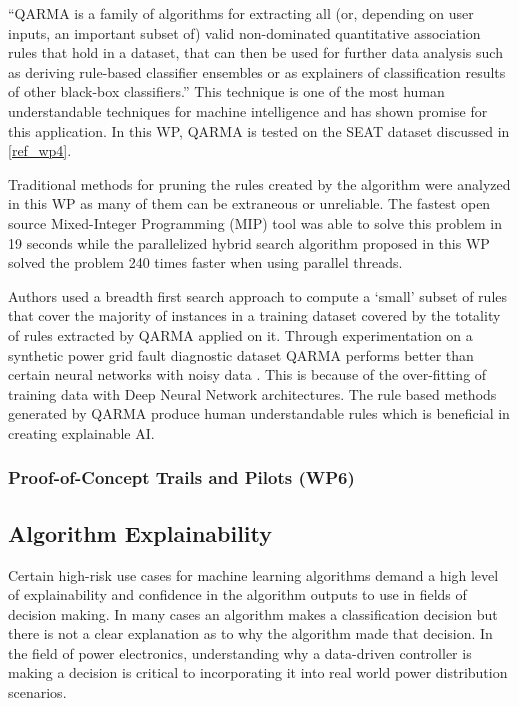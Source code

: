 \enquote{QARMA is a family of algorithms for extracting all (or, depending on user inputs, an important subset of) valid non-dominated quantitative association rules that hold in a dataset, that can then be used for further data analysis such as deriving rule-based classifier ensembles or as explainers of classification results of other black-box classifiers.}  This technique is one of the most human understandable techniques for machine intelligence and has shown promise for this application. In this WP, QARMA is tested on the SEAT dataset discussed in \ref{ref_wp4}.

Traditional methods for pruning the rules created by the algorithm were analyzed in this WP as many of them can be extraneous or unreliable. The fastest open source Mixed-Integer Programming (MIP) tool was able to solve this problem in 19 seconds while the parallelized hybrid search algorithm proposed in this WP solved the problem 240 times faster when using parallel threads.

Authors \cite{wp5.1} used a breadth first search approach to compute a `small' subset of rules that cover the majority of instances in a training dataset covered by the totality of rules extracted by QARMA applied on it. Through experimentation on a synthetic power grid fault diagnostic dataset QARMA performs better than certain neural networks with noisy data \parencite{ml-performance-power-trans}. This is because of the over-fitting of training data with Deep Neural Network architectures. The rule based methods generated by QARMA produce human understandable rules which is beneficial in creating explainable AI.

\subsubsection{Proof-of-Concept Trails and Pilots (WP6)}
\label{ref_wp6}


\subsection{Algorithm Explainability}

Certain high-risk use cases for machine learning algorithms demand a high level of explainability and confidence in the algorithm outputs to use in fields of decision making. In many cases an algorithm makes a classification decision but there is not a clear explanation as to why the algorithm made that decision. In the field of power electronics, understanding why a data-driven controller is making a decision is critical to incorporating it into real world power distribution scenarios. 


